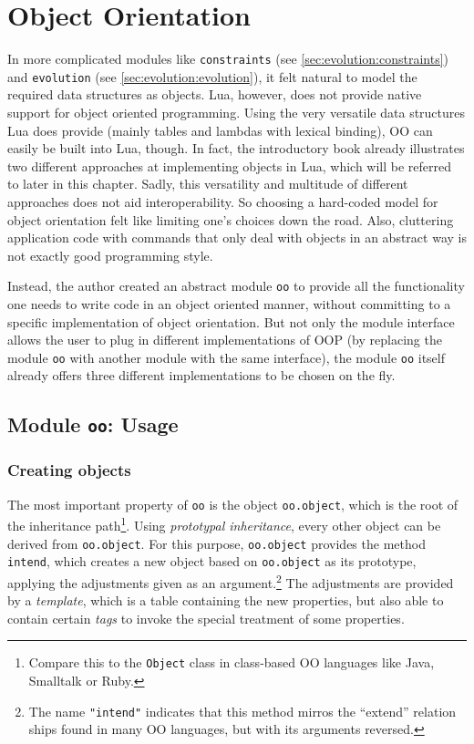 \chapter{Object Orientation}
\label{oo}
\label{chap:oo}

In more complicated modules like \texttt{constraints} (see \ref{sec:evolution:constraints}) and \texttt{evolution} (see \ref{sec:evolution:evolution}), it felt natural to model the required data structures as objects. Lua, however, does not provide native support for object oriented programming. Using the very versatile data structures Lua does provide (mainly tables and lambdas with lexical binding), OO can easily be built into Lua, though. In fact, the introductory book \cite{Ierusalimschy2006} already illustrates two different approaches at implementing objects in Lua, which will be referred to later in this chapter. Sadly, this versatility and multitude of different approaches does not aid interoperability. So choosing a hard-coded model for object orientation felt like limiting one's choices down the road. Also, cluttering application code with commands that only deal with objects in an abstract way is not exactly good programming style.

Instead, the author created an abstract module \texttt{oo} to provide all the functionality one needs to write code in an object oriented manner, without committing to a specific implementation of object orientation. But not only the module interface allows the user to plug in different implementations of OOP (by replacing the module \texttt{oo} with another module with the same interface), the module \texttt{oo} itself already offers three different implementations to be chosen on the fly.

\section{Module \texttt{oo}: Usage}
\label{sec:oo:usage}

\subsection{Creating objects}

The most important property of \texttt{oo} is the object \texttt{oo.object}, which is the root of the inheritance path\footnote{Compare this to the \texttt{Object} class in class-based OO languages like Java, Smalltalk or Ruby.}. Using \emph{prototypal inheritance}, every other object can be derived from \texttt{oo.object}. For this purpose, \texttt{oo.object} provides the method \texttt{intend}, which creates a new object based on \texttt{oo.object} as its prototype, applying the adjustments given as an argument.\footnote{The name \texttt{"intend"} indicates that this method mirros the ``extend'' relation ships found in many OO languages, but with its arguments reversed.} The adjustments are provided by a \emph{template}, which is a table containing the new properties, but also able to contain certain \emph{tags} to invoke the special treatment of some properties.


